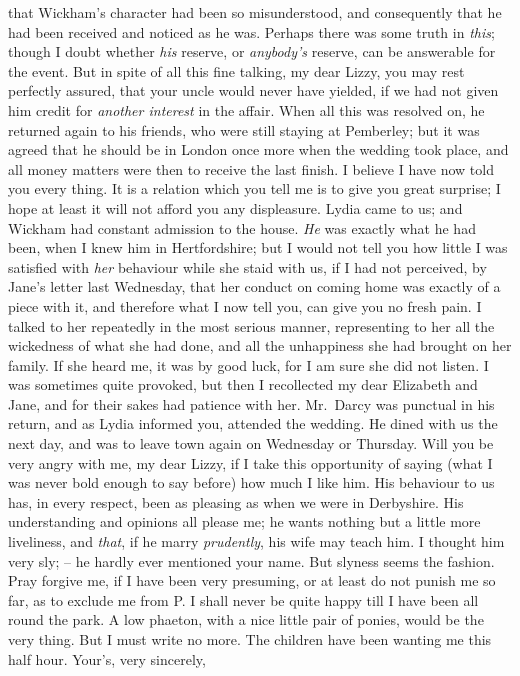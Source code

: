 \begin{letter}
that Wickham’s character had been so misunderstood,
and consequently that he had been received and noticed
as he was. Perhaps there was some truth in \textit{this}; though
I doubt whether \textit{his} reserve, or \textit{anybody’s} reserve, can be
answerable for the event. But in spite of all this fine
talking, my dear Lizzy, you may rest perfectly assured,
that your uncle would never have yielded, if we had not
given him credit for \textit{another interest} in the affair. When
all this was resolved on, he returned again to his friends,
who were still staying at Pemberley; but it was agreed
that he should be in London once more when the wedding
took place, and all money matters were then to receive
the last finish. I believe I have now told you every
thing. It is a relation which you tell me is to give you
great surprise; I hope at least it will not afford you any
displeasure. Lydia came to us; and Wickham had
constant admission to the house. \textit{He} was exactly what
he had been, when I knew him in Hertfordshire; but
I would not tell you how little I was satisfied with \textit{her}
behaviour while she staid with us, if I had not perceived,
by Jane’s letter last Wednesday, that her conduct on
coming home was exactly of a piece with it, and therefore
what I now tell you, can give you no fresh pain. I talked
to her repeatedly in the most serious manner, representing to
her all the wickedness of what she had done, and all the
unhappiness she had brought on her family. If she heard
me, it was by good luck, for I am sure she did not listen.
I was sometimes quite provoked, but then I recollected
my dear Elizabeth and Jane, and for their sakes had
patience with her. Mr.\ Darcy was punctual in his return,
and as Lydia informed you, attended the wedding. He
dined with us the next day, and was to leave town again
on Wednesday or Thursday. Will you be very angry with
me, my dear Lizzy, if I take this opportunity of saying
(what I was never bold enough to say before) how much
I like him. His behaviour to us has, in every respect, been
as pleasing as when we were in Derbyshire. His understanding
and opinions all please me; he wants nothing
but a little more liveliness, and \textit{that}, if he marry \textit{prudently},
his wife may teach him. I thought him very sly; -- he
hardly ever mentioned your name. But slyness seems the
fashion. Pray forgive me, if I have been very presuming,
or at least do not punish me so far, as to exclude me from
P. I shall never be quite happy till I have been all round
the park. A low phaeton, with a nice little pair of ponies,
would be the very thing. But I must write no more.
The children have been wanting me this half hour. Your’s,
very sincerely,

\end{letter}

